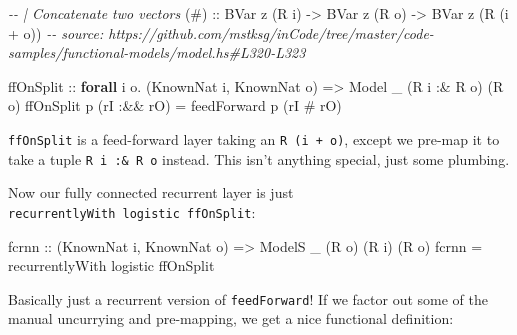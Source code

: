 \documentclass[]{article}
\newenvironment{Shaded}{}{}
\newcommand{\CommentTok}[1]{\textcolor[rgb]{0.38,0.63,0.69}{\textit{#1}}}
\newcommand{\DataTypeTok}[1]{\textcolor[rgb]{0.56,0.13,0.00}{#1}}
\newcommand{\KeywordTok}[1]{\textcolor[rgb]{0.00,0.44,0.13}{\textbf{#1}}}
\newcommand{\NormalTok}[1]{#1}
\newcommand{\OperatorTok}[1]{\textcolor[rgb]{0.40,0.40,0.40}{#1}}
\newcommand{\OtherTok}[1]{\textcolor[rgb]{0.00,0.44,0.13}{#1}}
\begin{document}
\begin{Shaded}
\begin{Highlighting}[]
\CommentTok{{-}{-} | Concatenate two vectors}
\OtherTok{(\#) ::} \DataTypeTok{BVar}\NormalTok{ z (}\DataTypeTok{R}\NormalTok{ i) }\OtherTok{{-}\textgreater{}} \DataTypeTok{BVar}\NormalTok{ z (}\DataTypeTok{R}\NormalTok{ o) }\OtherTok{{-}\textgreater{}} \DataTypeTok{BVar}\NormalTok{ z (}\DataTypeTok{R}\NormalTok{ (i }\OperatorTok{+}\NormalTok{ o))}
\CommentTok{{-}{-} source: https://github.com/mstksg/inCode/tree/master/code{-}samples/functional{-}models/model.hs\#L320{-}L323}

\NormalTok{ffOnSplit}
\OtherTok{    ::} \KeywordTok{forall}\NormalTok{ i o}\OperatorTok{.}\NormalTok{ (}\DataTypeTok{KnownNat}\NormalTok{ i, }\DataTypeTok{KnownNat}\NormalTok{ o)}
    \OtherTok{=\textgreater{}} \DataTypeTok{Model}\NormalTok{ \_ (}\DataTypeTok{R}\NormalTok{ i }\OperatorTok{:\&} \DataTypeTok{R}\NormalTok{ o) (}\DataTypeTok{R}\NormalTok{ o)}
\NormalTok{ffOnSplit p (rI }\OperatorTok{:\&\&}\NormalTok{ rO) }\OtherTok{=}\NormalTok{ feedForward p (rI }\OperatorTok{\#}\NormalTok{ rO)}
\end{Highlighting}
\end{Shaded}

\texttt{ffOnSplit} is a feed-forward layer taking an \texttt{R\ (i\ +\ o)},
except we pre-map it to take a tuple \texttt{R\ i\ :\&\ R\ o} instead. This
isn't anything special, just some plumbing.

Now our fully connected recurrent layer is just
\texttt{recurrentlyWith\ logistic\ ffOnSplit}:

\begin{Shaded}
\begin{Highlighting}[]
\NormalTok{fcrnn\textquotesingle{}}
\OtherTok{    ::}\NormalTok{ (}\DataTypeTok{KnownNat}\NormalTok{ i, }\DataTypeTok{KnownNat}\NormalTok{ o)}
    \OtherTok{=\textgreater{}} \DataTypeTok{ModelS}\NormalTok{ \_ (}\DataTypeTok{R}\NormalTok{ o) (}\DataTypeTok{R}\NormalTok{ i) (}\DataTypeTok{R}\NormalTok{ o)}
\NormalTok{fcrnn\textquotesingle{} }\OtherTok{=}\NormalTok{ recurrentlyWith logistic ffOnSplit}
\end{Highlighting}
\end{Shaded}

Basically just a recurrent version of \texttt{feedForward}! If we factor out
some of the manual uncurrying and pre-mapping, we get a nice functional
definition:
\end{document}
